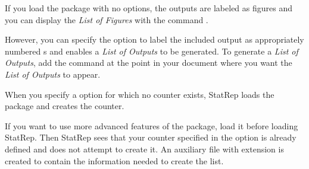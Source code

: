\documentclass[article,oneside]{memoir}
\newcommand*{\StatRep}{\textsf{StatRep}\xspace}
\begin{document}
  If you load the package with no options, 
  the outputs are labeled as figures and you can display the \textit{List of Figures} 
  with the command .

  However, you can specify  the  option to
  label the included output as 
  appropriately numbered s and enables a \textit{List of Outputs} to be generated.
  To generate a \textit{List of Outputs}, add the  
  command at the point in your document where you want
  the \textit{List of Outputs} to appear. 
  

     When you specify a  option for which no counter exists, \StatRep loads the  package and creates the counter. 
     
     If you want to use more advanced features of the  package,
     load it before loading \StatRep. Then \StatRep sees that your counter specified in 
     the  option is already defined and does not attempt to create it.
     An auxiliary file with extension  is created to contain the information 
     needed to create the list.
     
\end{document}
